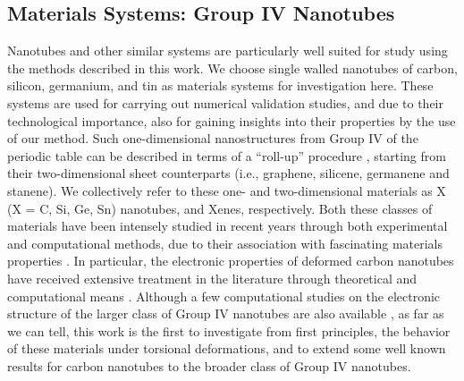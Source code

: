 \documentclass[preprint,12pt, 3p, sort&compress]{elsarticle}
\begin{document}
\subsection{Materials Systems: Group IV Nanotubes}
\label{subsec:Materials_Systems}
Nanotubes and other similar systems are particularly well suited for study using the methods described in this work. We choose single walled nanotubes of carbon, silicon, germanium, and tin as materials systems for investigation here. These systems are used for carrying out numerical validation studies, and due to their technological importance, also for gaining insights into their properties by the use of our method. Such one-dimensional nanostructures from Group IV of the periodic table can be described in terms of a ``roll-up'' procedure \citep{evarestov2015theoretical}, starting from their two-dimensional sheet counterparts (i.e., graphene, silicene, germanene and stanene).  We collectively refer to these one- and two-dimensional materials as X (X = C, Si, Ge, Sn) nanotubes, and Xenes, respectively. Both these classes of materials have been intensely studied in recent years through both experimental and computational methods, due to their association with fascinating materials properties \cite{molle2017buckled, ni2011tunable, drummond2012electrically, balendhran2015elemental, zhu2015epitaxial, scalise2014vibrational, davila2014germanene, kara2012review, martel1998single, javey2003ballistic, popov2004carbon, gong2009nitrogen, park2009silicon, wu2012stable, park2011germanium, li2011controlled, zhao2006porous, xu2013graphene, bhimanapati2015recent, butler2013progress, naguib201425th, fiori2014electronics, koppens2014photodetectors, novoselov2004electric, novoselov2005two, geim2009graphene, iijima1993single,saito1998physical, sha2002silicon, wang2017band, blase1994hybridization, spataru2004excitonic, yang2000electronic, fagan2000ab, benedict1995static, zhang2003silicon, yang2005electronic, giovannetti2008doping, vogt2012silicene, davila2014germanene, zhu2015epitaxial, seifert2001tubular}. In particular, the electronic properties of deformed carbon nanotubes have received extensive treatment in the literature through theoretical and computational means \citep{yang2000electronic, ding2002analytical, yang1999band, najafi2016analysis, ding2003curvature, Dumitrica_Tight_Binding1, sreekala2008effect, rochefort1999electrical, heyd1997uniaxial, kane1997size}. Although a few computational studies on the electronic structure of the larger class of Group IV nanotubes are also available \citep{wang2017band, ghosh2019symmetry, abbasi2018structural, abbasi2019band, abbasi2018theoretical}, as far as we can tell, this work is the first to investigate from first principles, the behavior of these materials under torsional deformations, and to extend some well known results for carbon nanotubes to the broader class of Group IV nanotubes.
\end{document}

